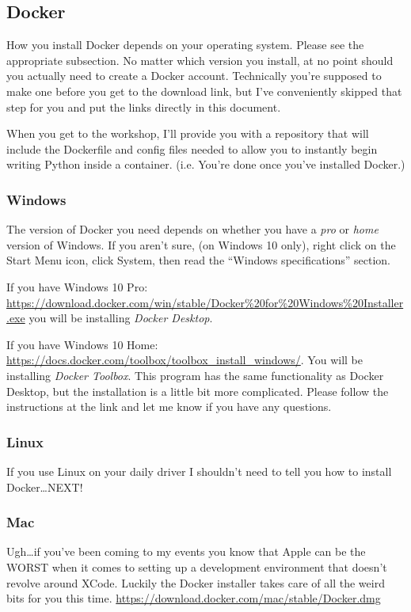 \documentclass[12pt]{article}
\begin{document}
    \subsection{Docker}
    How you install Docker depends on your operating system.  Please see
    the appropriate subsection.  No matter which version you install, at
    no point should you actually need to create a Docker account.  Technically
    you're supposed to make one before you get to the download link, but I've
    conveniently skipped that step for you and put the links directly in this
    document.

    When you get to the workshop, I'll provide you with a repository that will
    include the Dockerfile and config files needed to allow you to instantly
    begin writing Python inside a container. (i.e. You're done once you've
    installed Docker.)

    \subsubsection{Windows}
    The version of Docker you need depends on whether you have a
    \emph{pro} or \emph{home} version of Windows.  If you aren't sure,
    (on Windows 10 only), right click on the Start Menu icon, click System,
    then read the ``Windows specifications'' section.

    If you have Windows 10 Pro: \url{https://download.docker.com/win/stable/Docker%20for%20Windows%20Installer.exe}
    you will be installing \emph{Docker Desktop}.

    If you have Windows 10 Home: \url{https://docs.docker.com/toolbox/toolbox_install_windows/}.
    You will be installing \emph{Docker Toolbox}.  This program has the same functionality
    as Docker Desktop, but the installation is a little  bit more complicated.  Please
    follow the instructions at the link and let me know if you have any questions.
    \subsubsection{Linux}
    If you use Linux on your daily driver I shouldn't need to tell you how
    to install Docker\dots NEXT!

    \subsubsection{Mac}
    Ugh\dots if you've been coming to my events you know that Apple can be
    the WORST when it comes to setting up a development environment that
    doesn't revolve around XCode.  Luckily the Docker installer takes care
    of all the weird bits for you this time. \url{https://download.docker.com/mac/stable/Docker.dmg}
\end{document}
